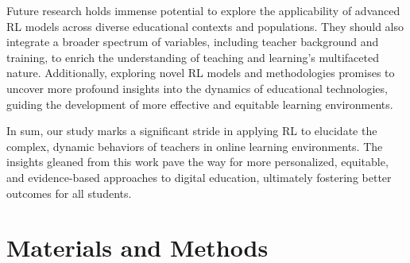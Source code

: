 \documentclass[
  number,
  preprint,
  3p,
  onecolumn]{elsarticle}
\begin{document}
Future research holds immense potential to explore the applicability of
advanced RL models across diverse educational contexts and populations.
They should also integrate a broader spectrum of variables, including
teacher background and training, to enrich the understanding of teaching
and learning's multifaceted nature. Additionally, exploring novel RL
models and methodologies promises to uncover more profound insights into
the dynamics of educational technologies, guiding the development of
more effective and equitable learning environments.

In sum, our study marks a significant stride in applying RL to elucidate
the complex, dynamic behaviors of teachers in online learning
environments. The insights gleaned from this work pave the way for more
personalized, equitable, and evidence-based approaches to digital
education, ultimately fostering better outcomes for all students.

\section{Materials and Methods}\label{materials-and-methods}
\end{document}
